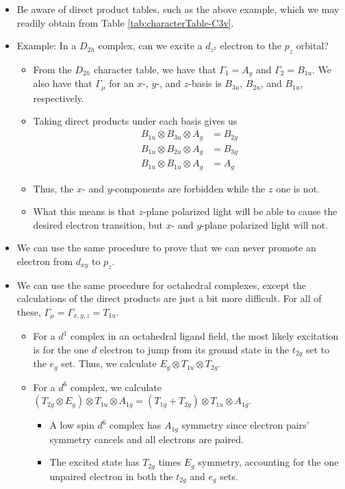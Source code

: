 \documentclass[../notes.tex]{subfiles}
\begin{document}
\begin{itemize}
    \item Be aware of direct product tables, such as the above example, which we may readily obtain from Table \ref{tab:characterTable-C3v}.
    \item Example: In a $D_{2h}$ complex, can we excite a $d_{z^2}$ electron to the $p_z$ orbital?
    \begin{itemize}
        \item From the $D_{2h}$ character table, we have that $\Gamma_1=A_g$ and $\Gamma_2=B_{1u}$. We also have that $\Gamma_\mu$ for an $x$-, $y$-, and $z$-basis is $B_{3u}$, $B_{2u}$, and $B_{1u}$, respectively.
        \item Taking direct products under each basis gives us
        \begin{align*}
            B_{1u}\otimes B_{3u}\otimes A_g &= B_{2g}\tag{$x$-basis}\\
            B_{1u}\otimes B_{2u}\otimes A_g &= B_{3g}\tag{$y$-basis}\\
            B_{1u}\otimes B_{1u}\otimes A_g &= A_g\tag{$z$-basis}
        \end{align*}
        \item Thus, the $x$- and $y$-components are forbidden while the $z$ one is not.
        \item What this means is that $z$-plane polarized light will be able to cause the desired electron transition, but $x$- and $y$-plane polarized light will not.
    \end{itemize}
    \item We can use the same procedure to prove that we can never promote an electron from $d_{xy}$ to $p_z$.
    \item We can use the same procedure for octahedral complexes, except the calculations of the direct products are just a bit more difficult. For all of these, $\Gamma_\mu=\Gamma_{x,y,z}=T_{1u}$.
    \begin{itemize}
        \item For a $d^1$ complex in an octahedral ligand field, the most likely excitation is for the one $d$ electron to jump from its ground state in the $t_{2g}$ set to the $e_g$ set. Thus, we calculate $E_g\otimes T_{1u}\otimes T_{2g}$.
        \item For a $d^6$ complex, we calculate $(T_{2g}\otimes E_g)\otimes T_{1u}\otimes A_{1g}=(T_{1g}+T_{2g})\otimes T_{1u}\otimes A_{1g}$.
        \begin{itemize}
            \item A low spin $d^6$ complex has $A_{1g}$ symmetry since electron pairs' symmetry cancels and all electrons are paired.
            \item The excited state has $T_{2g}$ times $E_g$ symmetry, accounting for the one unpaired electron in both the $t_{2g}$ and $e_g$ sets.
        \end{itemize}
    \end{itemize}
\end{itemize}
\end{document}
